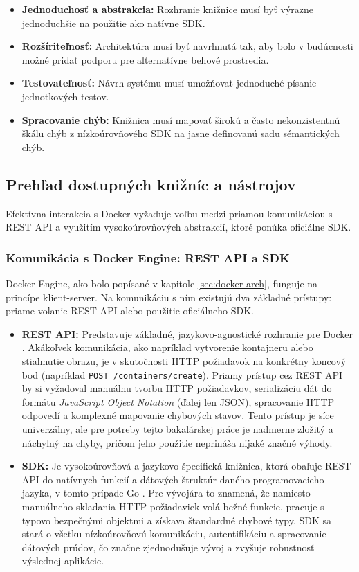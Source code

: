 \documentclass[
 program=infpvs,
  language=slovak,
  figures=false,
  tables=false,
  sourcecodes,
  glossaries,
  index
]{kidiplom}
\begin{document}
{\begin{itemize}
    \item \textbf{Jednoduchosť a abstrakcia:} Rozhranie knižnice musí byť výrazne jednoduchšie na použitie ako natívne SDK.
    \item \textbf{Rozšíriteľnosť:} Architektúra musí byť navrhnutá tak, aby bolo v budúcnosti možné pridať podporu pre alternatívne behové prostredia.
    \item \textbf{Testovateľnosť:} Návrh systému musí umožňovať jednoduché písanie jednotkových testov.
    \item \textbf{Spracovanie chýb:} Knižnica musí mapovať širokú a často nekonzistentnú škálu chýb z nízkoúrovňového SDK na jasne definovanú sadu sémantických chýb.
\end{itemize}



\subsection{Prehľad dostupných knižníc a nástrojov}  \label{sec:prehlad-kniznic}
Efektívna interakcia s Docker vyžaduje voľbu medzi priamou komunikáciou s REST API a využitím vysokoúrovňových abstrakcií, ktoré ponúka oficiálne SDK.


\subsubsection{Komunikácia s Docker Engine: REST API a SDK}
Docker Engine, ako bolo popísané v kapitole \ref{sec:docker-arch}, funguje na princípe klient-server. Na komunikáciu s ním existujú dva základné prístupy: priame volanie REST API alebo použitie oficiálneho SDK.

\begin{itemize}
    \item \textbf{REST API:} Predstavuje základné, jazykovo-agnostické rozhranie pre Docker \cite{docker-api}. Akákoľvek komunikácia, ako napríklad vytvorenie kontajneru alebo stiahnutie obrazu, je v skutočnosti HTTP požiadavok na konkrétny koncový bod (napríklad \texttt{POST /containers/create}). Priamy prístup cez REST API by si vyžadoval manuálnu tvorbu HTTP požiadavkov, serializáciu dát do formátu \textit{JavaScript Object Notation} (ďalej len JSON), spracovanie HTTP odpovedí a komplexné mapovanie chybových stavov. Tento prístup je síce univerzálny, ale pre potreby tejto bakalárskej práce je nadmerne zložitý a náchylný na chyby, pričom jeho použitie neprináša nijaké značné výhody.
    \item \textbf{SDK:} Je vysokoúrovňová a jazykovo špecifická knižnica, ktorá obaľuje REST API do natívnych funkcií a dátových štruktúr daného programovacieho jazyka, v tomto prípade Go \cite{docker-go-sdk}. Pre vývojára to znamená, že namiesto manuálneho skladania HTTP požiadaviek volá bežné funkcie, pracuje s typovo bezpečnými objektmi a získava štandardné chybové typy. SDK sa stará o všetku nízkoúrovňovú komunikáciu, autentifikáciu a spracovanie dátových prúdov, čo značne zjednodušuje vývoj a zvyšuje robustnosť výslednej aplikácie.
\end{itemize}

}
\end{document}
